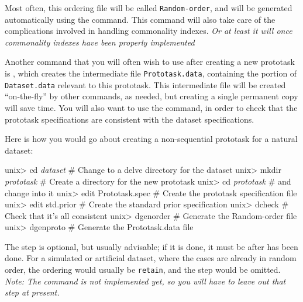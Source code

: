 Most often, this ordering file will be called \texttt{Random-order},
and will be generated automatically using the \dgenorder{} command.
This command will also take care of the complications involved in
handling commonality indexes.  \emph{Or at least it will once
commonality indexes have been properly implemented}

Another command that you will often wish to use after creating a new
prototask is \dgenproto{}, which creates the intermediate file
\texttt{Prototask.data}, containing the portion of
\texttt{Dataset.data} relevant to this prototask.  This intermediate
file will be created ``on-the-fly'' by other commands, as needed, but
creating a single permanent copy will save time.  You will also
want to use the \dcheck{} command, in order to check that the 
prototask specifications are consistent with the dataset specifications.

Here is how you would go about creating a non-sequential prototask for
a natural dataset:\vspace{-4pt}
\begin{Session}
unix> cd \textit{dataset}           # Change to a delve directory for the dataset 
unix> mkdir \textit{prototask}      # Create a directory for the new prototask
unix> cd \textit{prototask}         #   and change into it
unix> edit Prototask.spec  # Create the prototask specification file
unix> edit std.prior       # Create the standard prior specification 
unix> dcheck               # Check that it's all consistent 
unix> dgenorder            # Generate the Random-order file
unix> dgenproto            # Generate the Prototask.data file
\end{Session}\vspace{-4pt}

The \dgenproto{} step is optional, but usually advisable; if it is
done, it must be after \dgenorder{} has been done.  For a simulated or
artificial dataset, where the cases are already in random order, the
ordering would usually be \texttt{retain}, and the \dgenorder{} step
would be omitted.  \emph{Note: The \dcheck{} command is not 
implemented yet, so you will have to leave out that step at present.}
